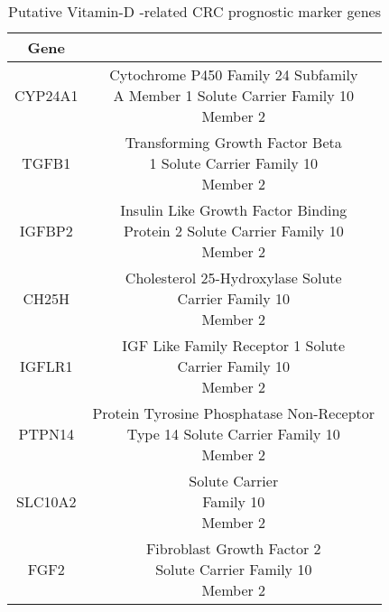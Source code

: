 \documentclass[fleqn,10pt]{SelfArx} %
\begin{document}
\begin{table}[ht]
	\centering
	\begin{tabular}{cc}
		\hline
		Gene & \\
		\hline
		CYP24A1 & \makecell{Cytochrome P450 Family 24 Subfamily \\A Member 1 Solute Carrier Family 10 \\Member 2}\\

			TGFB1 &\makecell{Transforming Growth Factor Beta\\ 1 Solute Carrier Family 10 \\Member 2}\\

			IGFBP2 &\makecell{Insulin Like Growth Factor Binding\\ Protein 2 Solute Carrier Family 10 \\Member 2} \\

			CH25H &\makecell{Cholesterol 25-Hydroxylase Solute\\ Carrier Family 10\\ Member 2} \\

			IGFLR1 &\makecell{IGF Like Family Receptor 1 Solute\\ Carrier Family 10\\ Member 2}\\

			PTPN14 &\makecell{Protein Tyrosine Phosphatase Non-Receptor\\ Type 14 Solute Carrier Family 10\\ Member 2}\\

			SLC10A2 &  \makecell{Solute Carrier\\ Family 10\\ Member 2}\\

			FGF2 &\makecell{Fibroblast Growth Factor 2\\ Solute Carrier Family 10\\ Member 2}\\
		\hline
	\end{tabular}
	\caption{Putative Vitamin-D -related CRC prognostic marker genes}
	\label{tab:suvmark}
\end{table}
\end{document}

